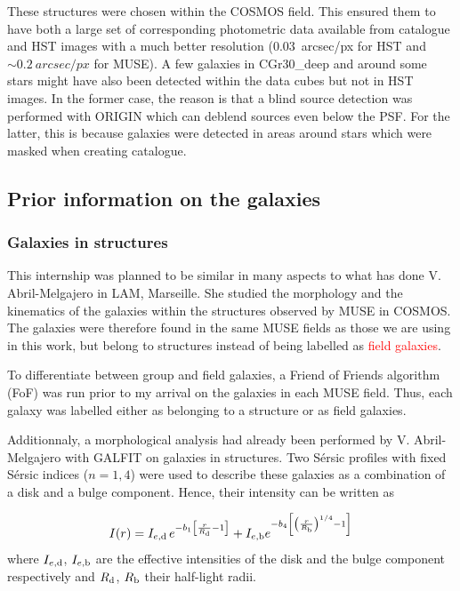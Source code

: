 These structures were chosen within the COSMOS field. This ensured them to have both a large set of corresponding photometric data available from  catalogue and HST images with a much better resolution (\SI{0.03}{arcsec/px} for HST and $\sim \SI{0.2}{arcsec/px}$ for MUSE). A few galaxies in CGr30\_deep and around some stars might have also been detected within the data cubes but not in HST images. In the former case, the reason is that a blind source detection was performed with ORIGIN  which can deblend sources even below the PSF. For the latter, this is because galaxies were detected in areas around stars which were masked when creating  catalogue.

\subsection{Prior information on the galaxies}

\subsubsection{Galaxies in structures}

This internship was planned to be similar in many aspects to what has done V. Abril-Melgajero in LAM, Marseille. She studied the morphology and the kinematics of the galaxies within the structures observed by MUSE in COSMOS. The galaxies were therefore found in the same MUSE fields as those we are using in this work, but belong to structures instead of being labelled as \textcolor{red}{field galaxies}. 

To differentiate between group and field galaxies, a Friend of Friends algorithm (FoF) was run prior to my arrival on the galaxies in each MUSE field. Thus, each galaxy was labelled either as belonging to a structure or as field galaxies.

Additionnaly, a morphological analysis had already been performed by V. Abril-Melgajero with GALFIT on galaxies in structures. Two Sérsic profiles with fixed Sérsic indices ($n = 1, 4$) were used to describe these galaxies as a combination of a disk and a bulge component. Hence, their intensity can be written as

\begin{equation}
	I(r) = I_{e, \rm{d}} \, e^{-b_1 \left [ \frac{r}{R_{\rm{d}}} -1 \right ]} + I_{e , \rm{b}} e^{- b_4 \left [ \left ( \frac{r}{R_{\rm{b}}} \right )^{1/4} -1 \right ]}
	\label{eq:GALFIT_light_profile}
\end{equation}
where $I_{e, \rm{d}}$, $I_{e, \rm{b}}$ are the effective intensities of the disk and the bulge component respectively and $R_{\rm{d}}$, $R_{\rm{b}}$ their half-light radii.

